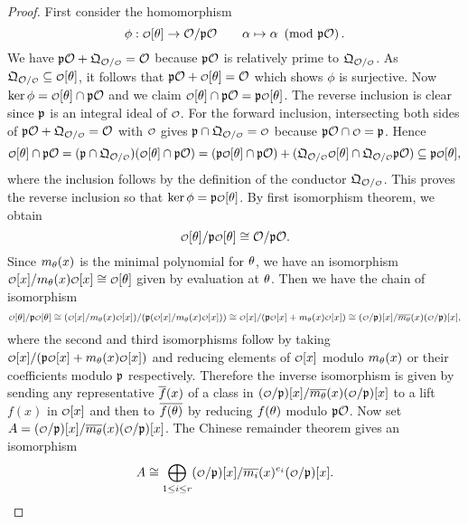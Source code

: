     \begin{proof}
      First consider the homomorphism
      \[
        \phi:\smc{O}[\t] \to \mc{O}/\mf{p}\mc{O} \qquad \a \mapsto \a \tmod{\mf{p}\mc{O}}.
      \]
      We have $\mf{p}\mc{O}+\mf{Q}_{\mc{O}/\smc{O}} = \mc{O}$ because $\mathfrak{p}\mathcal{O}$ is relatively prime to $\mf{Q}_{\mc{O}/\smc{O}}$. As $\mf{Q}_{\mc{O}/\smc{O}} \subseteq \smc{O}[\t]$, it follows that $\mf{p}\mc{O}+\smc{O}[\t] = \mc{O}$ which shows $\phi$ is surjective. Now $\ker\phi = \smc{O}[\t] \cap \mf{p}\mc{O}$ and we claim $\smc{O}[\t] \cap \mf{p}\mc{O} = \mf{p}\smc{O}[\t]$. The reverse inclusion is clear since $\mathfrak{p}$ is an integral ideal of $\smc{O}$. For the forward inclusion, intersecting both sides of $\mf{p}\mc{O}+\mf{Q}_{\mc{O}/\smc{O}} = \mc{O}$ with $\smc{O}$ gives $\mf{p} \cap \mf{Q}_{\mc{O}/\smc{O}} = \smc{O}$ because $\mf{p}\mc{O} \cap \smc{O} = \mf{p}$. Hence
      \[
        \smc{O}[\t] \cap \mf{p}\mc{O} = (\mf{p} \cap \mf{Q}_{\mc{O}/\smc{O}})(\smc{O}[\t] \cap \mf{p}\mc{O}) = (\mf{p}\smc{O}[\t] \cap \mf{p}\mc{O})+(\mf{Q}_{\mc{O}/\smc{O}}\smc{O}[\t] \cap \mf{Q}_{\mc{O}/\smc{O}}\mf{p}\mc{O}) \subseteq \mf{p}\smc{O}[\t],
      \]
      where the inclusion follows by the definition of the conductor $\mf{Q}_{\mc{O}/\smc{O}}$. This proves the reverse inclusion so that $\ker\phi = \mf{p}\smc{O}[\t]$. By first isomorphism theorem, we obtain
      \[
        \smc{O}[\t]/\mf{p}\smc{O}[\t] \cong \mc{O}/\mf{p}\mc{O}.
      \]
      Since $m_{\theta}(x)$ is the minimal polynomial for $\theta$, we have an isomorphism $\smc{O}[x]/m_{\t}(x)\smc{O}[x] \cong \smc{O}[\t]$ given by evaluation at $\theta$. Then we have the chain of isomorphism
      \[
        \smc{O}[\t]/\mf{p}\smc{O}[\t] \cong (\smc{O}[x]/m_{\t}(x)\smc{O}[x])/(\mf{p}(\smc{O}[x]/m_{\t}(x)\smc{O}[x])) \cong \smc{O}[x]/(\mf{p}\smc{O}[x]+m_{\t}(x)\smc{O}[x]) \cong (\smc{O}/\mf{p})[x]/\conj{m_{\t}}(x)(\smc{O}/\mf{p})[x],
      \]
      where the second and third isomorphisms follow by taking $\smc{O}[x]/(\mf{p}\smc{O}[x]+m_{\t}(x)\smc{O}[x])$ and reducing elements of $\smc{O}[x]$ modulo $m_{\theta}(x)$ or their coefficients modulo $\mathfrak{p}$ respectively. Therefore the inverse isomorphism is given by sending any representative $\overline{f}(x)$ of a class in $(\smc{O}/\mf{p})[x]/\conj{m_{\t}}(x)(\smc{O}/\mf{p})[x]$ to a lift $f(x)$ in $\smc{O}[x]$ and then to $\overline{f(\theta)}$ by reducing $f(\theta)$ modulo $\mathfrak{p}\mathcal{O}$. Now set $A = (\smc{O}/\mf{p})[x]/\conj{m_{\t}}(x)(\smc{O}/\mf{p})[x]$. The Chinese remainder theorem gives an isomorphism
      \[
        A \cong \bigop_{1 \le i \le r}(\smc{O}/\mf{p})[x]/\conj{m_{i}}(x)^{e_{i}}(\smc{O}/\mf{p})[x].
\]
\end{proof}
